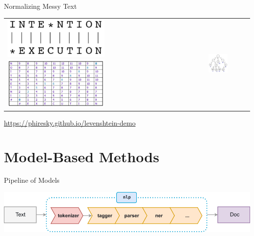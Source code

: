 \documentclass[10pt]{beamer}
\begin{document}
\begin{frame}{Normalizing Messy Text}

\begin{tabular}{p{5cm} p{7cm}}
    \vspace{0pt}
    \includegraphics[width=0.5\textwidth]{figures/string-alignment.png}
	  \vspace{0pt}
    \includegraphics[width=0.5\textwidth]{figures/edit-distance-table.png}
    &
    \vspace{0pt}
    \includegraphics[width=0.5\textwidth]{figures/trie-example.png}
\end{tabular}

\begin{center}
  \textcolor{blue}{\url{https://phiresky.github.io/levenshtein-demo}}
\end{center}

\end{frame}

\section{Model-Based Methods}

\begin{frame}{Pipeline of Models}

\begin{center}
  \includegraphics[width=1.0\textwidth]{figures/pipeline.png}
\end{center}

\end{frame}
\end{document}
